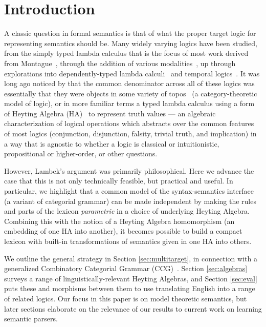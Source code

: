 \documentclass[11pt,a4paper,acceptedWithA]{article}
\newcommand{\ha}{\textsc{HA}\xspace}
\newcommand{\ccg}{\textsc{CCG}\xspace}
\begin{document}
\section{Introduction}
A classic question in formal semantics is that of what the proper target logic for representing semantics should be. Many widely varying logics have been studied, from the simply typed lambda calculus that is the focus of most work derived from Montague~\cite{montague1970universal,montagueEFL70,montaguePTQ73}, through the addition of various modalities~\cite{montague1972pragmatics,van1977tense}, up through explorations into dependently-typed lambda calculi~\cite{chatzikyriakidis2017modern,chatz2014nlcoq,bekki14dts,bekki2012LIRA,sundholm1986proof,ranta1991intuitionistic,ranta1994ttg} and temporal logics~\cite{nelken1996automatic,harris2015generating,dzifcak2009and}.
It was long ago noticed by \citet{lambek1988categorial} that the common denominator across all of these logics was essentially that they were objects in some variety of topos~\cite{fourman1979sheaves} (a category-theoretic model of logic), or in more familiar terms a typed lambda calculus using a form of Heyting Algebra (\textsc{HA})~\cite{gabbaysemantical} to represent truth values --- an algebraic characterization of logical operations which abstracts over the common features of most logics (conjunction, disjunction, falsity, trivial truth, and implication) in a way that is agnostic to whether a logic is classical or intuitionistic, propositional or higher-order, or other questions. 

However, Lambek's argument was primarily philosophical.  Here we advance the case that this is not only technically feasible, but practical and useful.
In particular, we highlight that a common model of the syntax-semantics interface (a variant of categorial grammar) can be made independent by making the rules and parts of the lexicon \emph{parametric} in a choice of underlying Heyting Algebra.
Combining this with the notion of a Heyting Algebra homomorphism (an embedding of one \textsc{HA} into another), it becomes possible to build a compact lexicon with built-in transformations of semantics given in one \ha into others.

We outline the general strategy in Section \ref{sec:multitarget}, in connection with a generalized Combinatory Categorial Grammar (\ccg)~\cite{steedman-ccg:1987,Steedman:2001,steedman2012taking}. Section \ref{sec:algebras} surveys a range of linguistically-relevant Heyting Algebras, and Section \ref{sec:eval} puts these and morphisms between them to use translating English into a range of related logics.
Our focus in this paper is on model theoretic semantics, but later sections elaborate on the relevance of our results to current work on learning semantic parsers.
\end{document}
